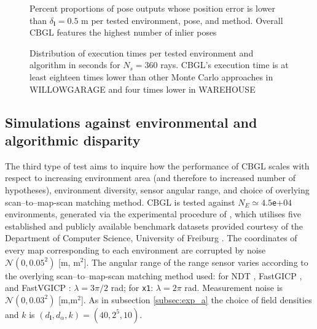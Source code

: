 \begin{figure}
  
  \caption{\small Percent proportions of pose outputs whose position error is
           lower than $\delta_{\bm{l}} = 0.5$ m per tested environment, pose,
           and method. Overall CBGL features the highest number of inlier poses}
  \label{fig:b:inliers_per_pose}
\end{figure}

\begin{figure}
  
  \vspace{0.1cm}
  \caption{\small Distribution of execution times per tested environment and
           algorithm in seconds for $N_s = 360$ rays. CBGL's execution time is
           at least eighteen times lower than other Monte Carlo approaches in
           WILLOWGARAGE and four times lower in WAREHOUSE}
  \label{fig:b:execution_times}
\end{figure}


\subsection{Simulations against environmental and algorithmic disparity }
\label{subsec:exp_c}

The third type of test aims to inquire how the performance of CBGL scales with
respect to increasing environment area (and therefore to increased number of
hypotheses), environment diversity, sensor angular range, and choice of
overlying scan--to--map-scan matching method. CBGL is tested against $N_E \simeq
4.5$\texttt{e}+$04$ environments, generated via the experimental procedure of
\cite{Filotheou2023a}, which utilises five established and publicly available
benchmark datasets provided courtesy of the Department of Computer Science,
University of Freiburg \cite{datasets_link}. The coordinates of every map
corresponding to each environment are corrupted by noise
$\mathcal{N}(0,0.05^2)$ [m, m$^2$]. The angular range of the range sensor
varies according to the overlying scan--to--map-scan matching method used: for
NDT \cite{ndt}, FastGICP \cite{fgi}, and FastVGICP \cite{fvg}: $\lambda =
3\pi/2$ rad; for \texttt{x1}: $\lambda = 2\pi$ rad. Measurement noise is
$\mathcal{N}(0,0.03^2)$ [m,m$^2$]. As in subsection \ref{subsec:exp_a} the
choice of field densities and $k$ is $(d_{\bm{l}},d_{\alpha},k) = (40, 2^5,
10)$.

